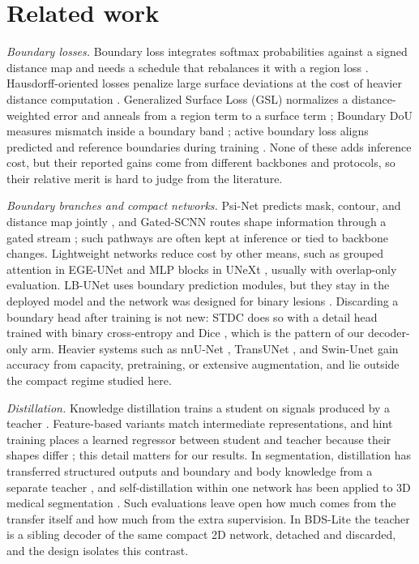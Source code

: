 \documentclass[fleqn,10pt,lineno]{wlpeerj}
\begin{document}
\section*{Related work}

\emph{Boundary losses.} Boundary loss integrates softmax probabilities against a signed distance map and needs a schedule that rebalances it with a region loss \citep{Kervadec2019Boundary}. Hausdorff-oriented losses penalize large surface deviations at the cost of heavier distance computation \citep{Karimi2020Reducing}. Generalized Surface Loss (GSL) normalizes a distance-weighted error and anneals from a region term to a surface term \citep{Celaya2024A}; Boundary DoU measures mismatch inside a boundary band \citep{Sun2023Boundary}; active boundary loss aligns predicted and reference boundaries during training \citep{Wang2022Active}. None of these adds inference cost, but their reported gains come from different backbones and protocols, so their relative merit is hard to judge from the literature.

\emph{Boundary branches and compact networks.} Psi-Net predicts mask, contour, and distance map jointly \citep{Murugesan2019PsiNet}, and Gated-SCNN routes shape information through a gated stream \citep{Takikawa2019GatedSCNN}; such pathways are often kept at inference or tied to backbone changes. Lightweight networks reduce cost by other means, such as grouped attention in EGE-UNet \citep{Ruan2023EGEUNet} and MLP blocks in UNeXt \citep{Valanarasu2022UNeXt}, usually with overlap-only evaluation. LB-UNet uses boundary prediction modules, but they stay in the deployed model and the network was designed for binary lesions \citep{Xu2024LBUNet}. Discarding a boundary head after training is not new: STDC does so with a detail head trained with binary cross-entropy and Dice \citep{Fan2021STDC}, which is the pattern of our decoder-only arm. Heavier systems such as nnU-Net \citep{Isensee2021nnUNet}, TransUNet \citep{Chen2021TransUNet}, and Swin-Unet \citep{Cao2022SwinUnet} gain accuracy from capacity, pretraining, or extensive augmentation, and lie outside the compact regime studied here.

\emph{Distillation.} Knowledge distillation trains a student on signals produced by a teacher \citep{Hinton2015Distilling}. Feature-based variants match intermediate representations, and hint training places a learned regressor between student and teacher because their shapes differ \citep{Romero2015FitNets}; this detail matters for our results. In segmentation, distillation has transferred structured outputs \citep{Liu2019Structured} and boundary and body knowledge from a separate teacher \citep{Liu2024BPKD}, and self-distillation within one network has been applied to 3D medical segmentation \citep{Wang2023MISSU, Banerjee2024Dual}. Such evaluations leave open how much comes from the transfer itself and how much from the extra supervision. In BDS-Lite the teacher is a sibling decoder of the same compact 2D network, detached and discarded, and the design isolates this contrast.
\end{document}
